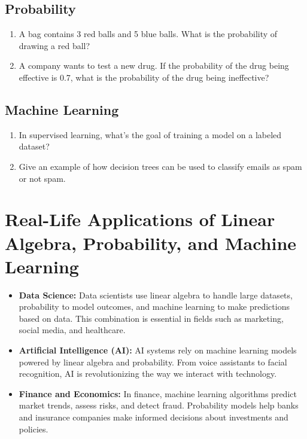 \subsection{Probability}
\begin{enumerate}
    \item A bag contains 3 red balls and 5 blue balls. What is the probability of drawing a red ball?
    \item A company wants to test a new drug. If the probability of the drug being effective is 0.7, what is the probability of the drug being ineffective?
\end{enumerate}

\subsection{Machine Learning}
\begin{enumerate}
    \item In supervised learning, what’s the goal of training a model on a labeled dataset?
    \item Give an example of how decision trees can be used to classify emails as spam or not spam.
\end{enumerate}

\section{Real-Life Applications of Linear Algebra, Probability, and Machine Learning}
\begin{itemize}
    \item \textbf{Data Science:} Data scientists use linear algebra to handle large datasets, probability to model outcomes, and machine learning to make predictions based on data. This combination is essential in fields such as marketing, social media, and healthcare.
    \item \textbf{Artificial Intelligence (AI):} AI systems rely on machine learning models powered by linear algebra and probability. From voice assistants to facial recognition, AI is revolutionizing the way we interact with technology.
    \item \textbf{Finance and Economics:} In finance, machine learning algorithms predict market trends, assess risks, and detect fraud. Probability models help banks and insurance companies make informed decisions about investments and policies.
\end{itemize}

